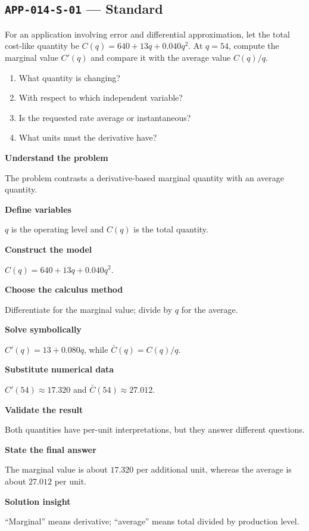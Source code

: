 \documentclass[11pt]{book}
\newcommand{\pid}[1]{\texttt{#1}}
\begin{document}
\subsection*{\pid{APP-014-S-01} — Standard}
\begin{problembox}
For an application involving error and differential approximation, let the total cost-like quantity be $C(q)=640+13q+0.040q^2$. At $q=54$, compute the marginal value $C'(q)$ and compare it with the average value $C(q)/q$.
\end{problembox}
\begin{promptbox}\begin{enumerate}
\item What quantity is changing?
\item With respect to which independent variable?
\item Is the requested rate average or instantaneous?
\item What units must the derivative have?
\end{enumerate}\end{promptbox}
\begin{solutionbox}
\textbf{Understand the problem}\par The problem contrasts a derivative-based marginal quantity with an average quantity.\par\medskip
\textbf{Define variables}\par $q$ is the operating level and $C(q)$ is the total quantity.\par\medskip
\textbf{Construct the model}\par $C(q)=640+13q+0.040q^2$.\par\medskip
\textbf{Choose the calculus method}\par Differentiate for the marginal value; divide by $q$ for the average.\par\medskip
\textbf{Solve symbolically}\par $C'(q)=13+0.080q$, while $\bar C(q)=C(q)/q$.\par\medskip
\textbf{Substitute numerical data}\par $C'(54)\approx 17.320$ and $\bar C(54)\approx 27.012$.\par\medskip
\textbf{Validate the result}\par Both quantities have per-unit interpretations, but they answer different questions.\par\medskip
\textbf{State the final answer}\par The marginal value is about $17.320$ per additional unit, whereas the average is about $27.012$ per unit.\par\medskip
\textbf{Solution insight}\par “Marginal” means derivative; “average” means total divided by production level.\par\medskip
\end{solutionbox}
\end{document}
